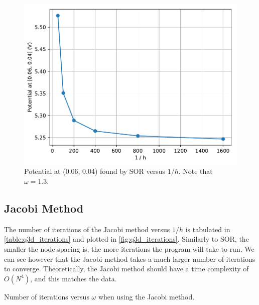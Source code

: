 \documentclass[a4paper,titlepage]{article}
\begin{document}
	\begin{figure}[!htb]
		\centering
		\includegraphics[width=\columnwidth]{plots/q3c_potential.pdf}
		\caption
		{Potential at (0.06, 0.04) found by SOR versus $1/h$. Note that $\omega=1.3$.}
		\label{fig:q3c_potential}
	\end{figure}
	
	\subsection{Jacobi Method}
	
	The number of iterations of the Jacobi method versus $1/h$ is tabulated in \autoref{table:q3d_iterations} and plotted in \autoref{fig:q3d_iterations}. Similarly to SOR, the smaller the node spacing is, the more iterations the program will take to run. We can see however that the Jacobi method takes a much larger number of iterations to converge. Theoretically, the Jacobi method should have a time complexity of $O(N^4)$, and this matches the data.
	
	\begin{table}[!htb]
		\centering
		\caption{Number of iterations versus $\omega$ when using the Jacobi method.}
		\label{table:q3d_iterations}
	\end{table}
\end{document}
